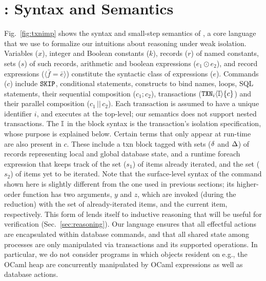 \section{\txnimp: Syntax and Semantics}
\label{sec:opsem}

\label{sec:syntax}



Fig.~\ref{fig:txnimp} shows the syntax and small-step semantics of
\txnimp, a core language that we use to formalize our intuitions about
reasoning under weak isolation. Variables ($x$), integer and Boolean
constants ($k$), records ($r$) of named constants, sets ($s$) of such
records, arithmetic and boolean expressions ($e_1 \odot e_2$), and
record expressions ($\langle \bar{f}=\bar{e} \rangle$) constitute the
syntactic class of expressions ($e$). Commands ($c$) include ${\tt SKIP}$,
conditional statements,  constructs to bind names, 
loops, SQL statements, their sequential composition ($c_1;c_2$),
transactions (${\tt TXN}_{i}\langle \mathbb{I} \rangle\{c\}$) and their parallel composition
($c_1\,||\,c_2$). Each transaction is assumed to have a unique
identifier $i$, and executes at the top-level; our semantics does not
support nested transactions. The $\mathbb{I}$ in the  block syntax is
the transaction's isolation specification, whose purpose is explained
below.  Certain terms that only appear at run-time are also present in
$c$.  These include a {\sf txn} block tagged with sets ($\delta$ and
$\Delta$) of records representing local and global database state, and a
runtime {\sf foreach} expression that keeps track of the set ($s_1$)
of items already iterated, and the set ($s_2$) of items yet to be
iterated. Note that the surface-level syntax of the 
command shown here is slightly different from the one used in previous
sections; its higher-order function has two arguments, $y$ and $z$,
which are invoked (during the reduction) with the set of
already-iterated items, and the current item, respectively. This form
of  lends itself to inductive reasoning that will be useful
for verification (Sec.~\ref{sec:reasoning}). Our language ensures
that all effectful actions are encapsulated within database commands,
and that all shared state among processes are only manipulated via
transactions and its supported operations.  In particular, we do not
consider programs in which objects resident on e.g., the OCaml heap
are concurrently manipulated by OCaml expressions as well as database
actions.



